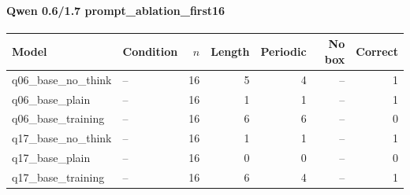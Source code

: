 \paragraph{Qwen 0.6/1.7 prompt\_\allowbreak{}ablation\_\allowbreak{}first16}
{\small\setlength{\tabcolsep}{4pt}
\begin{longtable}{@{}llrrrrr@{}}
\toprule
Model & Condition & $n$ & Length & Periodic & No box & Correct \\
\midrule\endhead
q06\_\allowbreak{}base\_\allowbreak{}no\_\allowbreak{}think & -- & 16 & 5 & 4 & -- & 1 \\
q06\_\allowbreak{}base\_\allowbreak{}plain & -- & 16 & 1 & 1 & -- & 1 \\
q06\_\allowbreak{}base\_\allowbreak{}training & -- & 16 & 6 & 6 & -- & 0 \\
q17\_\allowbreak{}base\_\allowbreak{}no\_\allowbreak{}think & -- & 16 & 1 & 1 & -- & 1 \\
q17\_\allowbreak{}base\_\allowbreak{}plain & -- & 16 & 0 & 0 & -- & 0 \\
q17\_\allowbreak{}base\_\allowbreak{}training & -- & 16 & 6 & 4 & -- & 1 \\
\bottomrule\end{longtable}
}

